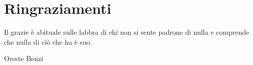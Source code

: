 \documentclass[10pt,a4paper,cleardoubleempty]{scrbook}
\begin{document}
\cleardoublepage
\part{Ringraziamenti}

\thispagestyle{empty}
\null{}
\begin{flushright}
\setlength{\epigraphwidth}{21em}
\epigraph{
\footnotesize{Il grazie è abituale sulle labbra di chi non si sente padrone di nulla e comprende che nulla di ciò che ha è suo.}
}{\footnotesize{Oreste Benzi}}
\end{flushright}\null


\end{document}
